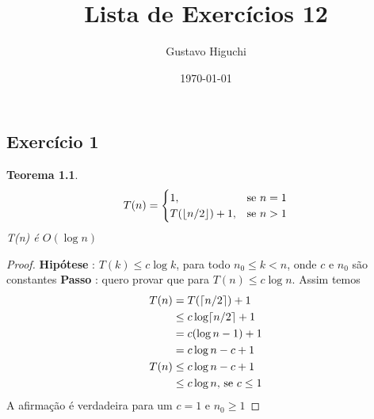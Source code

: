 \documentclass{article}
\title{Lista de Exercícios 12}
\author{Gustavo Higuchi}
\date{\today}
\DeclarePairedDelimiter\ceil{\lceil}{\rceil}
\DeclarePairedDelimiter\floor{\lfloor}{\rfloor}
\begin{document}
\maketitle

\tableofcontents
\newpage


\chapter{}
\section{Exercício 1}
\newtheorem{teo1}{Teorema}
\begin{teo1}
    \begin{equation}
        T(n)=\begin{cases}
        1, & \text{se $n = 1$}\\
        T(\floor*{n/2}) + 1, &\text{se $n > 1$}
    \end{cases}
    \end{equation}
    T(n) é $O(\log n)$
\end{teo1}
\begin{proof}
    \hfill \break
    \textbf{Hipótese} : $T(k) \leq c\log k$, para todo $n_0 \leq k < n$, onde $c$ e $n_0$ são constantes\newline
    \textbf{Passo} : quero provar que para $T(n) \leq c\log n$.\newline
    \hspace*{30pt} Assim temos \newline
    \begin{equation}
        \begin{split}
            T(n) &= T(\ceil*{n/2}) + 1 \\
            & \leq c\log\ceil*{n/2} + 1\\
            & = c(\log n-1) + 1\\
            & = c\log n - c + 1\\
            T(n) & \leq c\log n -c + 1\\
            & \leq c\log n \text{, se $c \leq 1$}
        \end{split}
    \end{equation}
    A afirmação é verdadeira para um $c = 1$ e $n_0 \geq 1$
\end{proof}
\end{document}
